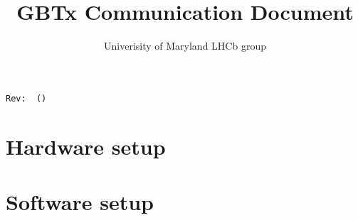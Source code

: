 \documentclass[11pt,letterpaper]{refart}
\title{GBTx Communication Document}
\author{Univerisity of Maryland LHCb group}
\begin{document}
\maketitle
\hfill\small{\texttt{Rev:~\gitVtags \gitAbbrevHash~(\gitAuthorDate)}}
\tableofcontents
\clearpage

\section{Hardware setup}



\section{Software setup}
\end{document}
